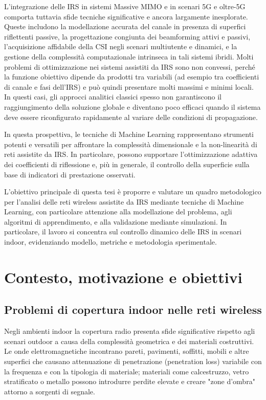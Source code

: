 \documentclass[12pt,a4paper]{report}
\begin{document}
L'integrazione delle IRS in sistemi Massive MIMO e in scenari 5G e
oltre-5G comporta tuttavia sfide tecniche significative e ancora
largamente inesplorate. Queste includono la modellazione accurata del
canale in presenza di superfici riflettenti passive, la progettazione
congiunta dei beamforming attivi e passivi, l'acquisizione affidabile
della CSI negli scenari multiutente e dinamici, e la gestione della
complessità computazionale intrinseca in tali sistemi ibridi. Molti
problemi di ottimizzazione nei sistemi assistiti da IRS sono non
convessi, perché la funzione obiettivo dipende da prodotti tra
variabili (ad esempio tra coefficienti di canale e fasi dell'IRS) e
può quindi presentare molti massimi e minimi locali. In questi casi,
gli approcci analitici classici spesso non garantiscono il
raggiungimento della soluzione globale e diventano poco efficaci
quando il sistema deve essere riconfigurato rapidamente al variare
delle condizioni di propagazione.

In questa prospettiva, le tecniche di Machine Learning rappresentano
strumenti potenti e versatili per affrontare la complessità
dimensionale e la non-linearità di reti assistite da IRS. In
particolare, possono supportare l'ottimizzazione adattiva dei
coefficienti di riflessione e, più in generale, il controllo della
superficie sulla base di indicatori di prestazione osservati.

L'obiettivo principale di questa tesi è proporre e valutare un quadro
metodologico per l'analisi delle reti wireless assistite da IRS
mediante tecniche di Machine Learning, con particolare attenzione
alla modellazione del problema, agli algoritmi di apprendimento, e
alla validazione mediante simulazioni. In particolare, il lavoro si
concentra sul controllo dinamico delle IRS in scenari indoor,
evidenziando modello, metriche e metodologia sperimentale.

\tableofcontents

\cleardoublepage
{}
\setcounter{page}{1}

\chapter{Contesto, motivazione e obiettivi}
\label{chap:contesto}

\section{Problemi di copertura indoor nelle reti wireless}
Negli ambienti indoor la copertura radio presenta sfide significative
rispetto agli scenari outdoor a causa della complessità geometrica e
dei materiali costruttivi. Le onde elettromagnetiche incontrano
pareti, pavimenti, soffitti, mobili e altre superfici che causano
attenuazione di penetrazione (penetration loss) variabile con la
frequenza e con la tipologia di materiale; materiali come
calcestruzzo, vetro stratificato o metallo possono introdurre perdite
elevate e creare "zone d'ombra" attorno a sorgenti di segnale.
\end{document}
